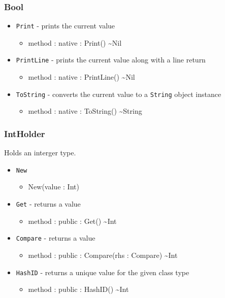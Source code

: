 \documentclass[11pt]{article}
\begin{document}
\subsubsection{Bool}
\begin{itemize}
\item \texttt{Print} - prints the current value
  \begin{itemize}
  \item method : native : Print() \textasciitilde Nil
  \end{itemize}
\item \texttt{PrintLine} - prints the current value along with a line
  return
  \begin{itemize}
  \item method : native : PrintLine() \textasciitilde Nil
  \end{itemize}
\item \texttt{ToString} - converts the current value to a
  \texttt{String} object instance
  \begin{itemize}
  \item method : native : ToString() \textasciitilde String
  \end{itemize}
\end{itemize}

\subsubsection{IntHolder}
Holds an interger type.
\begin{itemize}
\item \texttt{New}
  \begin{itemize}
  \item New(value : Int)
  \end{itemize}
\item \texttt{Get} - returns a value
  \begin{itemize}
  \item method : public : Get() \textasciitilde Int
  \end{itemize}
\item \texttt{Compare} - returns a value
  \begin{itemize}
  \item method : public : Compare(rhs : Compare) \textasciitilde Int
  \end{itemize}
\item \texttt{HashID} - returns a unique value for the given class
  type
  \begin{itemize}
  \item method : public : HashID() \textasciitilde Int
  \end{itemize}
\end{itemize}
\end{document}
